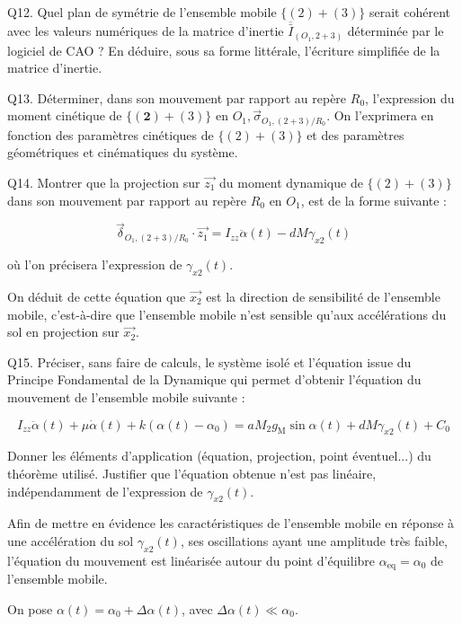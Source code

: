 \documentclass[10pt]{article}
\begin{document}
Q12. Quel plan de symétrie de l'ensemble mobile $\{(2)+(3)\}$ serait cohérent avec les valeurs numériques de la matrice d'inertie $\overline{\bar{I}}_{\left(O_{1}, 2+3\right)}$ déterminée par le logiciel de CAO ? En déduire, sous sa forme littérale, l'écriture simplifiée de la matrice d'inertie.

Q13. Déterminer, dans son mouvement par rapport au repère $R_{0}$, l'expression du moment cinétique de $\{(\mathbf{2})+(3)\}$ en $O_{1}, \vec{\sigma}_{O_{1},(2+3) / R_{0}}$. On l'exprimera en fonction des paramètres cinétiques de $\{(2)+(3)\}$ et des paramètres géométriques et cinématiques du système.

Q14. Montrer que la projection sur $\overrightarrow{z_{1}}$ du moment dynamique de $\{(2)+(3)\}$ dans son mouvement par rapport au repère $R_{0}$ en $O_{1}$, est de la forme suivante :

$$
\vec{\delta}_{O_{1},(2+3) / R_{0}} \cdot \overrightarrow{z_{1}}=I_{z z} \ddot{\alpha}(t)-d M \gamma_{x 2}(t)
$$

où l'on précisera l'expression de $\gamma_{x 2}(t)$.

On déduit de cette équation que $\overrightarrow{x_{2}}$ est la direction de sensibilité de l'ensemble mobile, c'est-à-dire que l'ensemble mobile n'est sensible qu'aux accélérations du sol en projection sur $\overrightarrow{x_{2}}$.

Q15. Préciser, sans faire de calculs, le système isolé et l'équation issue du Principe Fondamental de la Dynamique qui permet d'obtenir l'équation du mouvement de l'ensemble mobile suivante :


\begin{equation*}
I_{z z} \ddot{\alpha}(t)+\mu \dot{\alpha}(t)+k\left(\alpha(t)-\alpha_{0}\right)=a M_{2} g_{\mathrm{M}} \sin \alpha(t)+d M \gamma_{x 2}(t)+C_{0} \tag{eq.2}
\end{equation*}


Donner les éléments d'application (équation, projection, point éventuel...) du théorème utilisé. Justifier que l'équation obtenue n'est pas linéaire, indépendamment de l'expression de $\gamma_{x 2}(t)$.

Afin de mettre en évidence les caractéristiques de l'ensemble mobile en réponse à une accélération du sol $\gamma_{x 2}(t)$, ses oscillations ayant une amplitude très faible, l'équation du mouvement est linéarisée autour du point d'équilibre $\alpha_{\mathrm{eq}}=\alpha_{0}$ de l'ensemble mobile.

On pose $\alpha(t)=\alpha_{0}+\Delta \alpha(t)$, avec $\Delta \alpha(t) \ll \alpha_{0}$.
\end{document}
